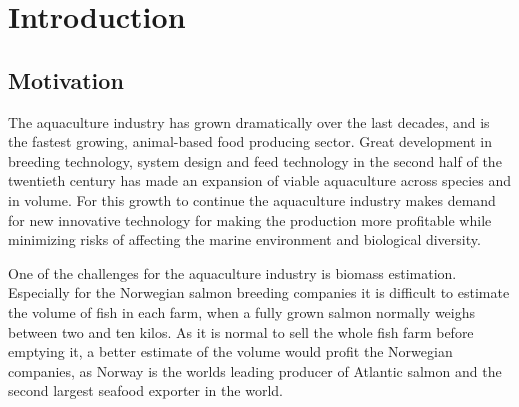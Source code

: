 \section{Introduction}\label{introduction}

\subsection{Motivation}\label{motivation}

The aquaculture industry has grown dramatically over the last decades, and is the fastest growing, animal-based food producing sector. 
Great development in breeding technology, system design and feed technology in the second half of the twentieth century has made an expansion of viable aquaculture across species and in volume.
For this growth to continue the aquaculture industry makes demand for new innovative technology for making the production more profitable while minimizing risks of affecting the marine environment and biological diversity.\cite{website:aquaculture}

One of the challenges for the aquaculture industry is biomass estimation. Especially for the Norwegian salmon breeding companies it is difficult to estimate the volume of fish in each farm, when a fully grown salmon normally weighs between two and ten kilos.\cite{website:biomass} As it is normal to sell the whole fish farm before emptying it, a better estimate of the volume would profit the Norwegian companies, as Norway is the worlds leading producer of Atlantic salmon and the second largest seafood exporter in the world.\cite{website:aquaculture}

